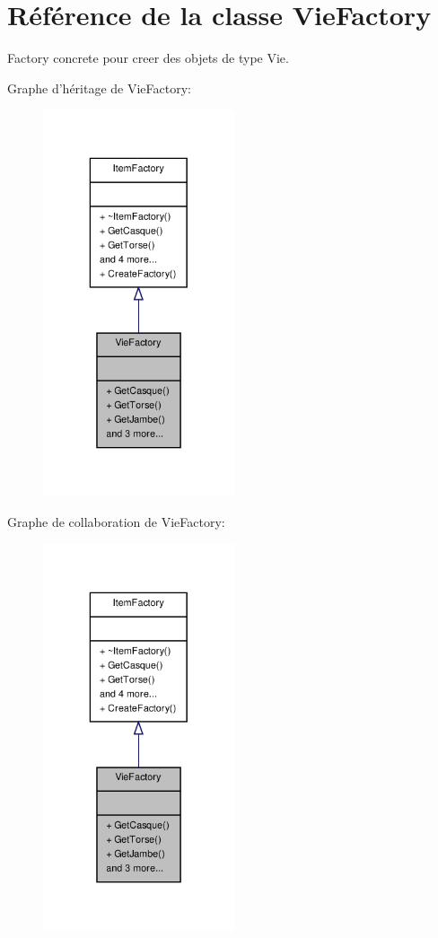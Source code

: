 \hypertarget{class_vie_factory}{\section{Référence de la classe Vie\-Factory}
\label{class_vie_factory}
}


Factory concrete pour creer des objets de type Vie.  




Graphe d'héritage de Vie\-Factory\-:
\nopagebreak
\begin{figure}[H]
\begin{center}
\leavevmode
\includegraphics[width=160pt]{class_vie_factory__inherit__graph}
\end{center}
\end{figure}


Graphe de collaboration de Vie\-Factory\-:
\nopagebreak
\begin{figure}[H]
\begin{center}
\leavevmode
\includegraphics[width=160pt]{class_vie_factory__coll__graph}
\end{center}
\end{figure}
